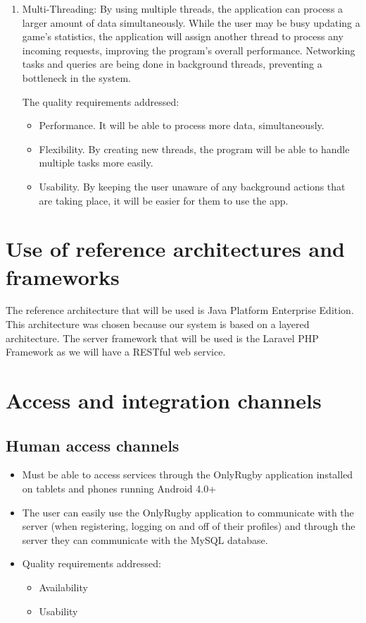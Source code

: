 \documentclass[hidelinks,a4paper,12pt]{article}
\begin{document}
\begin{enumerate}
		\item Multi-Threading:
		By using multiple threads, the application can process a larger amount of data simultaneously. While the user may be busy updating a game's statistics, the application will assign another thread to process any incoming requests, improving the program's overall performance. Networking tasks and queries are being done in background threads, preventing a bottleneck in the system.

		The quality requirements addressed:
		\begin{itemize}
			\item Performance. It will be able to process more data, simultaneously.
			\item Flexibility. By creating new threads, the program will be able to handle multiple tasks more easily.
			\item Usability. By keeping the user unaware of any background actions that are taking place, it will be easier for them to use the app.
		\end{itemize}
	\end{enumerate}

\section{Use of reference architectures and frameworks}
	The reference architecture that will be used is Java Platform Enterprise Edition. This architecture was chosen because our system is based on a layered architecture. The server framework that will be used is the Laravel PHP Framework as we will have a RESTful web service.

\newpage

\section{Access and integration channels}
	\subsection{Human access channels}
	\begin{itemize}
		\item Must be able to access services through the OnlyRugby application installed on tablets and phones running Android 4.0+
		\item The user can easily use the OnlyRugby application to communicate with the server (when registering, logging on and off of their profiles) and through the server they can communicate with the MySQL database.
		\item Quality requirements addressed:
			\begin{itemize}
				\item Availability
				\item Usability
			\end{itemize}
	\end{itemize}
\end{document}
